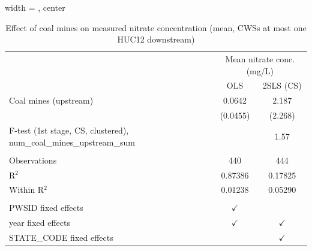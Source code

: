 
\begin{table}[htbp]
   
   \caption{\label{tab:6yr_dwnstrm_nitrate_mean} Effect of coal mines on measured nitrate concentration (mean, CWSs at most one HUC12 downstream)}
   \bigskip
   
   \centering
   
   \begin{adjustbox}{width = \textwidth, center}
      
      
      \begin{tabular}{lcc}
         \toprule
         
          & \multicolumn{2}{c}{Mean nitrate conc. (mg/L)}\\
         
                                                                                & OLS           & 2SLS (CS)\\  
         
         \midrule 
         Coal mines (upstream)                                                  & 0.0642        & 2.187\\   
                                                                                & (0.0455)      & (2.268)\\   
         
         F-test (1st stage, CS, clustered), num\_coal\_mines\_upstream\_sum     &               & 1.57\\  
         
          \\
         
         Observations                                                           & 440           & 444\\  
         R$^2$                                                                  & 0.87386       & 0.17825\\  
         Within R$^2$                                                           & 0.01238       & 0.05290\\  
         
          \\
         
         PWSID fixed effects                                                    & $\checkmark$  & \\  
         year fixed effects                                                     & $\checkmark$  & $\checkmark$\\   
         STATE\_CODE fixed effects                                              &               & $\checkmark$\\   
         

\end{tabular}
\end{adjustbox}
\end{table}
